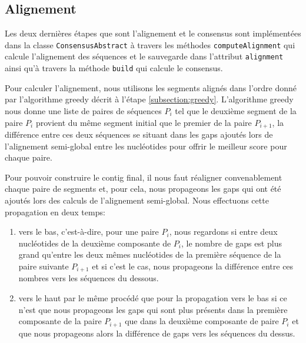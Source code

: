 
\subsection{Alignement}
\label{subsection:alignment}

Les deux dernières étapes que sont l'alignement et le consensus sont
implémentées dans la classe \verb|ConsensusAbstract| à travers les méthodes
\verb|computeAlignment| qui calcule l'alignement des séquences et le sauvegarde
dans l'attribut \verb|alignment| ainsi qu'à travers la méthode \verb|build|
qui calcule le consensus.

Pour calculer l'alignement, nous utilisons les segments alignés dans l'ordre
donné par l'algorithme greedy décrit à l'étape \ref{subsection:greedy}.
L'algorithme greedy nous donne une liste de paires de séquences $P_{i}$ tel
que le deuxième segment de la paire $P_{i}$ provient du même segment initial que
le premier de la paire $P_{i + 1}$, la différence entre ces deux séquences se
situant dans les gaps ajoutés lors de l'alignement semi-global entre les
nucléotides pour offrir le meilleur score pour chaque paire.


Pour pouvoir construire le contig final, il nous faut réaligner convenablement
chaque paire de segments et, pour cela, nous propageons les gaps qui ont été
ajoutés lors des calculs de l'alignement semi-global. Nous effectuons cette
propagation en deux temps:

\begin{enumerate}
	\item vers le bas, c'est-à-dire, pour une paire $P_{i}$, nous regardons si
		entre deux nucléotides de la deuxième composante de $P_{i}$, le nombre
		de gaps est plus grand qu'entre les deux mêmes nucléotides de la
		première séquence de la paire suivante $P_{i + 1}$ et si c'est le cas,
		nous propageons la différence entre ces nombres vers les séquences du
		dessous.
	\item vers le haut par le même procédé que pour la propagation vers le bas
		si ce n'est que nous propageons les gaps qui sont plus présents dans la
		première composante de la paire $P_{i + 1}$ que dans la deuxième
		composante de paire $P_{i}$ et que nous propageons alors la différence
		de gaps vers les séquences du dessus.
\end{enumerate}


